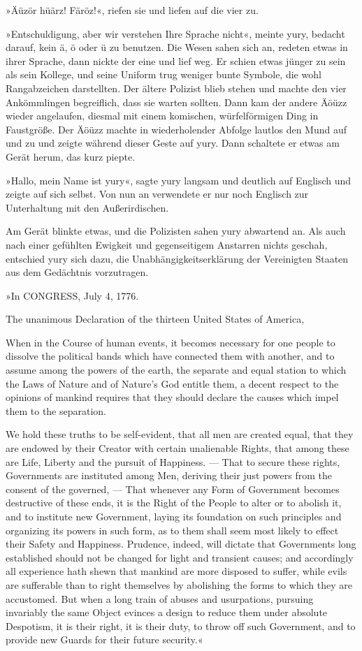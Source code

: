 »Äüzör hüärz! Färöz!«, riefen sie und liefen auf die vier zu.

»Entschuldigung, aber wir verstehen Ihre Sprache nicht«, meinte yury, bedacht darauf, kein ä, ö oder ü zu benutzen. Die Wesen sahen sich an, redeten etwas in ihrer Sprache, dann nickte der eine und lief weg. Er schien etwas jünger zu sein als sein Kollege, und seine Uniform trug weniger bunte Symbole, die wohl Rangabzeichen darstellten. Der ältere Polizist blieb stehen und machte den vier Ankömmlingen begreiflich, dass sie warten sollten. Dann kam der andere Äöüzz wieder angelaufen, diesmal mit einem komischen, würfelförmigen Ding in Faustgröße. Der Äöüzz machte in wiederholender Abfolge lautlos den Mund auf und zu und zeigte während dieser Geste auf yury. Dann schaltete er etwas am Gerät herum, das kurz piepte.

»Hallo, mein Name ist yury«, sagte yury langsam und deutlich auf Englisch und zeigte auf sich selbst. Von nun an verwendete er nur noch Englisch zur Unterhaltung mit den Außerirdischen.

Am Gerät blinkte etwas, und die Polizisten sahen yury abwartend an. Als auch nach einer gefühlten Ewigkeit und gegenseitigem Anstarren nichts geschah, entschied yury sich dazu, die Unabhängigkeitserklärung der Vereinigten Staaten aus dem Gedächtnis vorzutragen.

»In CONGRESS, July 4, 1776.

The unanimous Declaration of the thirteen United States of America,

When in the Course of human events, it becomes necessary for one people to dissolve the political bands which have connected them with another, and to assume among the powers of the earth, the separate and equal station to which the Laws of Nature and of Nature’s God entitle them, a decent respect to the opinions of mankind requires that they should declare the causes which impel them to the separation.

We hold these truths to be self-evident, that all men are created equal, that they are endowed by their Creator with certain unalienable Rights, that among these are Life, Liberty and the pursuit of Happiness. — That to secure these rights, Governments are instituted among Men, deriving their just powers from the consent of the governed, — That whenever any Form of Government becomes destructive of these ends, it is the Right of the People to alter or to abolish it, and to institute new Government, laying its foundation on such principles and organizing its powers in such form, as to them shall seem most likely to effect their Safety and Happiness. Prudence, indeed, will dictate that Governments long established should not be changed for light and transient causes; and accordingly all experience hath shewn that mankind are more disposed to suffer, while evils are sufferable than to right themselves by abolishing the forms to which they are accustomed. But when a long train of abuses and usurpations, pursuing invariably the same Object evinces a design to reduce them under absolute Despotism, it is their right, it is their duty, to throw off such Government, and to provide new Guards for their future security.«

